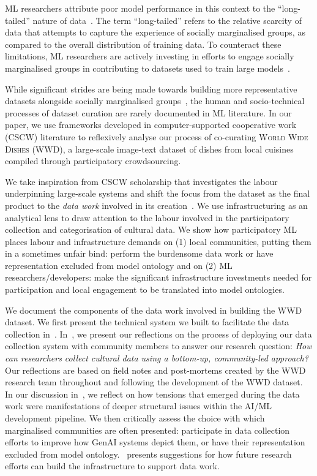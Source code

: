  ML researchers attribute poor model performance in this context to the ``long-tailed'' nature of data~\cite{massiceti2021orbit}. The term ``long-tailed'' refers to the relative scarcity of data that attempts to capture the experience of socially marginalised groups, as compared to the overall distribution of training data. To counteract these limitations, ML researchers are actively investing in efforts to engage socially marginalised groups in contributing to datasets used to train large models~\cite{singh2024aya_dataset,kirk2024prism,ramaswamy2023geodegeographicallydiverseevaluation}. 
 
While significant strides are being made towards building more representative datasets alongside socially marginalised groups~\cite{singh2024aya_dataset,massiceti2021orbit}, the human and socio-technical processes of dataset curation are rarely documented in ML literature. In our paper, we use frameworks developed in computer-supported cooperative work (CSCW) literature to reflexively analyse our process of co-curating \textsc{World Wide Dishes (WWD)}, a large-scale image-text dataset of dishes from local cuisines compiled through participatory crowdsourcing.

We take inspiration from CSCW scholarship that investigates the labour underpinning large-scale systems and shift the focus from the dataset as the final product to the \textit{data work} involved in its creation~\cite{sambasivan2021everyone,scheuermanDatasetsHavePolitics2021}. We use infrastructuring as an analytical lens to draw attention to the labour involved in the participatory collection and categorisation of cultural data. We show how participatory ML places labour and infrastructure demands on (1) local communities, putting them in a sometimes unfair bind: perform the burdensome data work or have representation excluded from model ontology and on (2) ML researchers/developers: make the significant infrastructure investments needed for participation and local engagement to be translated into model ontologies.

We document the components of the data work involved in building the \textsc{WWD} dataset. We first present the technical system we built to facilitate the data collection in~. In~, we present our reflections on the process of deploying our data collection system with community members to answer our research question: \textit{How can researchers collect cultural data using a bottom-up, community-led approach?} Our reflections are based on field notes and post-mortems created by the \textsc{WWD} research team throughout and following the development of the \textsc{WWD} dataset. In our discussion in~, we reflect on how tensions that emerged during the data work were manifestations of deeper structural issues within the AI/ML development pipeline. We then critically assess the choice with which marginalised communities are often presented: participate in data collection efforts to improve how GenAI systems depict them, or have their representation excluded from model ontology.~ presents suggestions for how future research efforts can build the infrastructure to support data work.

